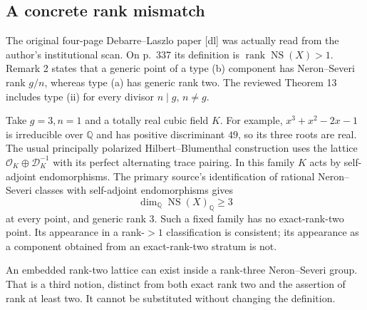 \documentclass[10pt]{article}
\begin{document}
\subsection*{A concrete rank mismatch}
The original four-page Debarre–Laszlo paper [dl] was actually read from the author’s institutional scan. On p. 337 its definition is \(\operatorname{rank}\operatorname{NS}(X)>1\). Remark 2 states that a generic point of a type (b) component has Neron–Severi rank \(g/n\), whereas type (a) has generic rank two. The reviewed Theorem 13 includes type (ii) for every divisor \(n\mid g\), \(n\ne g\).\par
Take \(g=3,n=1\) and a totally real cubic field \(K\). For example, \(x^3+x^2-2x-1\) is irreducible over \(\mathbb Q\) and has positive discriminant \(49\), so its three roots are real. The usual principally polarized Hilbert–Blumenthal construction uses the lattice \(\mathcal O_K\oplus\mathcal D_K^{-1}\) with its perfect alternating trace pairing. In this family \(K\) acts by self-adjoint endomorphisms. The primary source’s identification of rational Neron–Severi classes with self-adjoint endomorphisms gives \[\dim_\mathbb Q\operatorname{NS}(X)_\mathbb Q\ge3\] at every point, and generic rank \(3\). Such a fixed family has no exact-rank-two point. Its appearance in a rank-\(>1\) classification is consistent; its appearance as a component obtained from an exact-rank-two stratum is not.\par
An embedded rank-two lattice can exist inside a rank-three Neron–Severi group. That is a third notion, distinct from both exact rank two and the assertion of rank at least two. It cannot be substituted without changing the definition.\par
\end{document}
